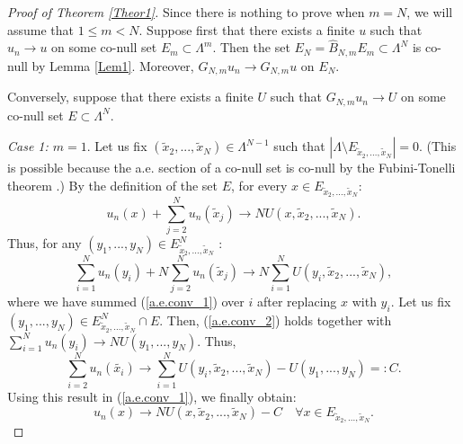 \documentclass[12pt,leqno]{amsart}
\numberwithin{equation}{section}
\numberwithin{theor}{section}
\numberwithin{rem}{section}
\begin{document}
\begin{proof}[Proof of Theorem \ref{Theor1}]
Since there is nothing to prove when $m=N$, we will assume that $1\leq m<N$.  
Suppose first that there exists a finite $u$ such that $u_n\rightarrow u$ on some co-null set 
$E_m\subset \Lambda^m$.  Then the set 
$E_N=\hat{B}_{N,m}E_m\subset \Lambda^N$ is co-null by Lemma \ref{Lem1}.  Moreover, 
$G_{N,m} u_n\rightarrow G_{N,m} u$ on $E_N$. 

Conversely, suppose that there exists a finite $U$ such that $G_{N,m} u_n\rightarrow U$ on some co-null set 
$E\subset \Lambda^N$.   

\textit{Case 1: $m=1$}.  Let us fix 
$(\tilde{x}_2,...,\tilde{x}_N)\in \Lambda^{N-1}$ such that 
$\left | \Lambda\setminus E_{\tilde{x}_2,...,\tilde{x}_N} \right | =0$.  
(This is possible because the a.e. section of a co-null 
set is co-null by the Fubini-Tonelli theorem \cite[Theorem 2.39]{Folland99}.)  By the definition of the set $E$, for every 
$x\in E_{\tilde{x}_2,...,\tilde{x}_N}$:
\begin{equation}
\label{a.e.conv_1}
u_n(x)+\sum_{j=2}^{N} u_n(\tilde{x}_j)\rightarrow N 
U(x, \tilde{x}_2,...,\tilde{x}_N).
\end{equation}
Thus, for any $(y_1,...,y_N)\in 
E_{\tilde{x}_2,...,\tilde{x}_N}^N $ :
\begin{equation}
\label{a.e.conv_2}
\sum_{i=1}^{N} u_n(y_i) + N\sum_{j=2}^{N} u_n(\tilde{x}_j)\rightarrow N \sum_{i=1}^{N}U (y_i,\tilde{x}_2,...,\tilde{x}_N),
\end{equation}
where we have summed (\ref{a.e.conv_1}) over $i$ after 
replacing $x$ with $y_i$.  Let us fix $(y_1,...,y_N)\in 
E_{\tilde{x}_2,...,\tilde{x}_N}^N\cap E $.  Then, 
(\ref{a.e.conv_2}) holds together with 
$\sum_{i=1}^{N} u_n(y_i) \rightarrow N U(y_1,...,y_N)$.  Thus, 
\begin{equation}
\label{a.e.conv_3}
\sum_{i=2}^{N} u_n(\tilde{x_i}) \rightarrow 
\sum_{i=1}^{N} U(y_i,\tilde{x}_2,...,\tilde{x}_N)-
U(y_1,...,y_N)=: C.
\end{equation}
Using this result in (\ref{a.e.conv_1}), we finally obtain:
\begin{equation}
u_n(x)\rightarrow N U(x, \tilde{x}_2,...,\tilde{x}_N)-C\quad 
\forall x\in E_{\tilde{x}_2,...,\tilde{x}_N}.
\end{equation}


\end{proof}
\end{document}
